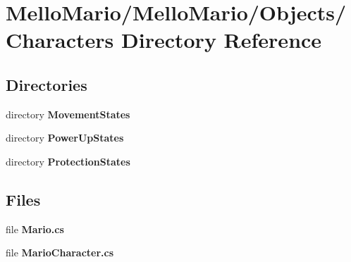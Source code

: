 \section{Mello\+Mario/\+Mello\+Mario/\+Objects/\+Characters Directory Reference}
\label{dir_21a3465859383fe40ba36bee7ee2b4dd}
\subsection*{Directories}
\begin{DoxyCompactItemize}
\item 
directory \textbf{ Movement\+States}
\item 
directory \textbf{ Power\+Up\+States}
\item 
directory \textbf{ Protection\+States}
\end{DoxyCompactItemize}
\subsection*{Files}
\begin{DoxyCompactItemize}
\item 
file \textbf{ Mario.\+cs}
\item 
file \textbf{ Mario\+Character.\+cs}
\end{DoxyCompactItemize}
